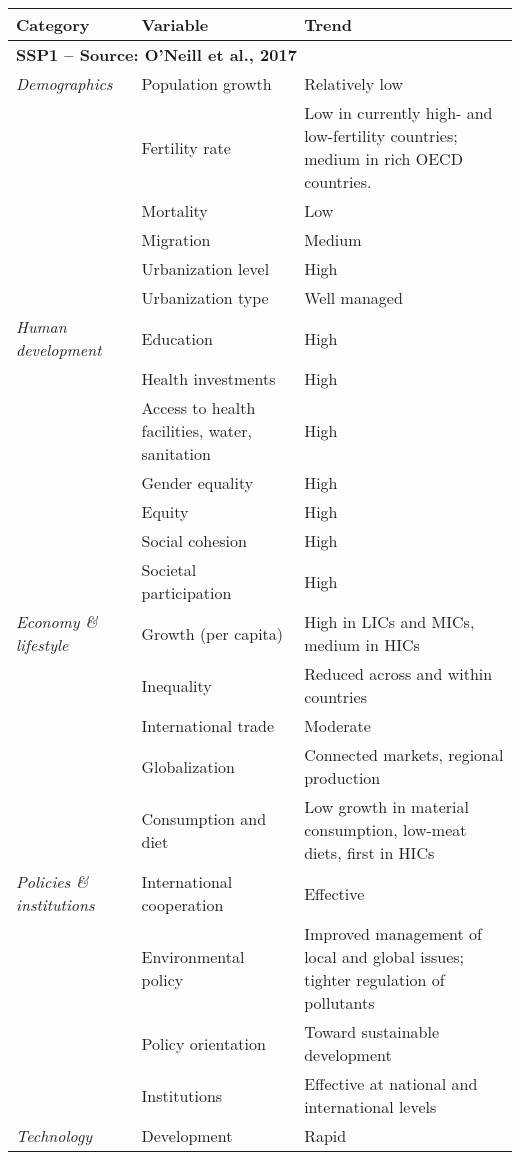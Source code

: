 {\scriptsize
\begin{longtable}{p{3cm}p{3.5cm}p{8cm}}
\toprule
Category & Variable & Trend \\ \midrule
\multicolumn{3}{l}{\textbf{SSP1 -- Source: O'Neill et al., 2017}}\\
\textit{Demographics} & Population growth & Relatively low\\
\textit{} & Fertility rate & Low in currently high- and low-fertility countries; medium in rich OECD countries.\\
\textit{} & Mortality & Low\\
\textit{} & Migration & Medium\\
\textit{} & Urbanization level & High\\
\textit{} & Urbanization type & Well managed\\
\textit{Human development} & Education & High\\
\textit{} & Health investments & High\\
\textit{} & Access to health facilities, water, sanitation & High\\
\textit{} & Gender equality & High\\
\textit{} & Equity & High\\
\textit{} & Social cohesion & High\\
\textit{} & Societal participation & High\\
\textit{Economy \& lifestyle} & Growth (per capita) & High in LICs and MICs, medium in HICs\\
\textit{} & Inequality & Reduced across and within countries\\
\textit{} & International trade & Moderate\\
\textit{} & Globalization & Connected markets, regional production\\
\textit{} & Consumption and diet & Low growth in material consumption, low-meat diets, first in HICs\\
\textit{Policies \& institutions} & International cooperation & Effective\\
\textit{} & Environmental policy & Improved management of local and global issues; tighter regulation of pollutants\\
\textit{} & Policy orientation & Toward sustainable development\\
\textit{} & Institutions & Effective at national and international levels\\
\textit{Technology} & Development & Rapid\\

\end{longtable}}
